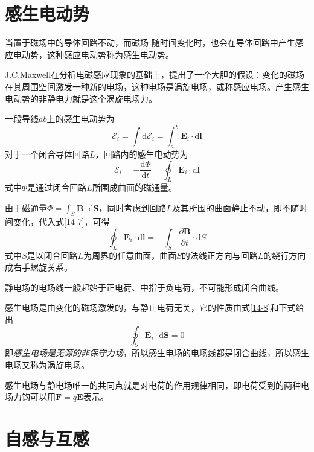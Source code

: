 \documentclass[12pt]{article}
\newcommand{\rmd}{\mathrm{d}}
\newcommand{\deriv}[2]{\frac{\rmd #1}{\rmd #2}}
\newcommand{\pderiv}[2]{\frac{\partial #1}{\partial #2}}
\begin{document}
\section{感生电动势}

当置于磁场中的导体回路不动，而磁场 随时间变化时，也会在导体回路中产生感应电动势，这种感应电动势称为感生电动势。

J.C.Maxwell在分析电磁感应现象的基础上，提出了一个大胆的假设：变化的磁场在其周围空间激发一种新的电场，这种电场是涡旋电场，或称感应电场。产生感生电动势的非静电力就是这个涡旋电场力。

一段导线\(ab\)上的感生电动势为
\begin{equation}
    \mathcal{E}_i = \int \rmd \mathcal{E}_i = \int_{a}^{b} \boldsymbol{E}_i \cdot \rmd \boldsymbol{l}
\end{equation}
对于一个闭合导体回路\(L\)，回路内的感生电动势为
\begin{equation}
    \mathcal{E}_i = -\deriv{\varPhi}{t} = \oint_L \boldsymbol{E}_i \cdot \rmd \boldsymbol{l}
    \label{14-7}
\end{equation}
式中\(\varPhi\)是通过闭合回路\(L\)所围成曲面的磁通量。

由于磁通量\(\varPhi = \int_S \boldsymbol{B} \cdot \rmd \boldsymbol{S}\)，同时考虑到回路\(L\)及其所围的曲面静止不动，即不随时间变化，代入式\ref{14-7}，可得
\begin{equation}
    \oint_L \boldsymbol{E}_i \cdot \rmd \boldsymbol{l} = -\int_{S} \pderiv{\boldsymbol{B}}{t} \cdot \rmd S
    \label{14-8}
\end{equation}
式中\(S\)是以闭合回路\(L\)为周界的任意曲面，曲面\(S\)的法线正方向与回路\(L\)的绕行方向成右手螺旋关系。

静电场的电场线一般起始于正电荷、中指于负电荷，不可能形成闭合曲线。

感生电场是由变化的磁场激发的，与静止电荷无关，它的性质由式\ref{14-8}和下式给出
\begin{equation}
    \oint_S \boldsymbol{E}_i \cdot \rmd \boldsymbol{S} = 0
\end{equation}
即\emph{感生电场是无源的非保守力场}，所以感生电场的电场线都是闭合曲线，所以感生电场又称为涡旋电场。

感生电场与静电场唯一的共同点就是对电荷的作用规律相同，即电荷受到的两种电场力钧可以用\(\boldsymbol{F} = q \boldsymbol{E}\)表示。

\section{自感与互感}
\end{document}

